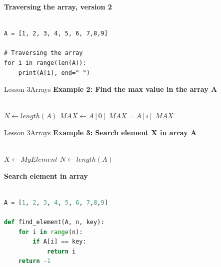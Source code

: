 \documentclass[aspectratio=1610]{beamer}
\begin{document}
\begin{frame}[fragile]
\LARGE
\textbf{Traversing the array, version 2}\\~\\
\Large
\begin{lstlisting}
A = [1, 2, 3, 4, 5, 6, 7,8,9]

# Traversing the array
for i in range(len(A)):
    print(A[i], end=" ")
\end{lstlisting}
\end{frame}




\begin{frame}{Lesson 3}{Arrays}
\Large
\textbf{Example 2: Find the max value in the array A}\\~\\

\label{MaxArray}
\begin{algorithmic}[1]
 
\State $N\gets length(A)$
\State $MAX\gets A[0]$
    \State \textbf{$MAX = A[i]$} 
\EndIf
\EndFor
\State \Return $MAX$
\EndProcedure
\end{algorithmic}
\end{frame}



\begin{frame}{Lesson 3}{Arrays}
\Large
\textbf{Example 3: Search element X in array A}\\~\\
\label{SearchArray}
\begin{algorithmic}[1]
 
\State $X\gets MyElement$
\State $N\gets length(A)$
    \State {}  
\EndIf
\EndFor
\State {} 
\EndProcedure
\end{algorithmic}
\end{frame}



\begin{frame}[fragile]
\LARGE
\textbf{Search element in array}\\~\\
\Large
\begin{lstlisting}[language=Python]
A = [1, 2, 3, 4, 5, 6, 7,8,9]

def find_element(A, n, key):
    for i in range(n):
        if A[i] == key:
            return i
    return -1

\end{lstlisting}
\end{frame}
\end{document}
